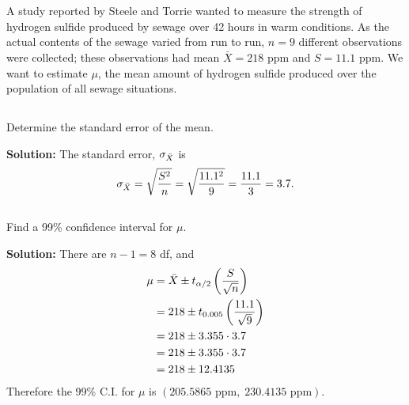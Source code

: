 \section{}
A study reported by Steele and Torrie wanted to measure the strength of hydrogen sulfide produced by sewage over 42 hours in warm conditions.  As the actual contents of the sewage varied from run to run, $n=9$ different observations were collected; these observations had mean $\bar{X}=218$ ppm and $S=11.1$ ppm.  We want to estimate $\mu$, the mean amount of hydrogen sulfide produced over the population of all sewage situations.
\subsection{}
    Determine the standard error of the mean.
    \begin{mybox}
        \textbf{Solution: } The standard error, $\sigma_{\bar{X}}$ is
        $$\sigma_{\bar{X}} = \sqrt{\frac{S^2}{n}} = \sqrt{\frac{11.1^2}{9}} = \frac{11.1}{3} = 3.7.$$
    \end{mybox}
    \vspace{1in}
\subsection{}
    Find a 99\% confidence interval for $\mu$.
    \begin{mybox}
        \textbf{Solution: } There are $n-1 = 8$ df, and 
        \begin{align}
            \mu &= \bar{X} \pm t_{\alpha/2}\left( {\frac{S}{\sqrt{n}}} \right)\notag\\
            &= 218 \pm t_{0.005}\left( {\frac{11.1}{\sqrt{9}}} \right)\notag\\
            &= 218 \pm 3.355 \cdot 3.7\notag\\
            &= 218 \pm 3.355 \cdot 3.7\notag\\
            &= 218 \pm 12.4135\notag
        \end{align}
        Therefore the 99\% C.I. for $\mu$ is $(205.5865\text{ ppm}, \; 230.4135\text{ ppm})$.
    \end{mybox}